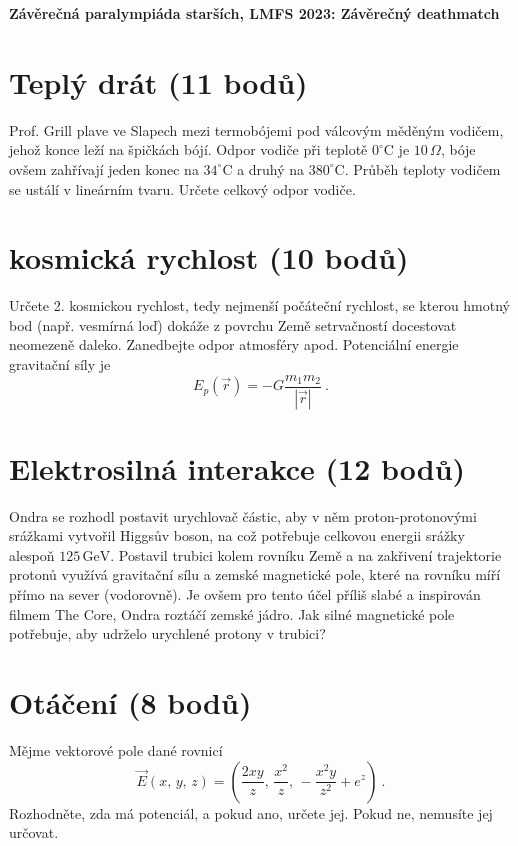 \documentclass[10pt,a4paper,landscape]{article}
\author{Ondřej Zelenka}
\begin{document}
\pagestyle{empty}
\textbf{\center\LARGE Závěrečná paralympiáda starších, LMFS 2023: Závěrečný deathmatch}
\vfill

\begin{multicols}{2}[]

\section{Teplý drát (11 bodů)}
Prof. Grill plave ve Slapech mezi termobójemi pod válcovým měděným vodičem, jehož konce leží na špičkách bójí. Odpor vodiče při teplotě $0^\circ\mathrm{C}$ je $10\,\Omega$, bóje ovšem zahřívají jeden konec na $34^\circ\mathrm{C}$ a druhý na $380^\circ\mathrm{C}$. Průběh teploty vodičem se ustálí v lineárním tvaru. Určete celkový odpor vodiče.

\begingroup\renewcommand{}
\section{kosmická rychlost (10 bodů)}
Určete 2. kosmickou rychlost, tedy nejmenší počáteční rychlost, se kterou hmotný bod (např. vesmírná loď) dokáže z povrchu Země setrvačností docestovat neomezeně daleko. Zanedbejte odpor atmosféry apod. Potenciální energie gravitační síly je
\begin{equation}
E_p\left(\vec{r}\right) = -G\frac{m_1m_2}{\left|\vec{r}\right|} ~.
\end{equation}
\endgroup

\section{Elektrosilná interakce (12 bodů)}
Ondra se rozhodl postavit urychlovač částic, aby v něm proton-protonovými srážkami vytvořil Higgsův boson, na což potřebuje celkovou energii srážky alespoň $125\,\mathrm{GeV}$. Postavil trubici kolem rovníku Země a na zakřivení trajektorie protonů využívá gravitační sílu a zemské magnetické pole, které na rovníku míří přímo na sever (vodorovně). Je ovšem pro tento účel příliš slabé a inspirován filmem The Core, Ondra roztáčí zemské jádro. Jak silné magnetické pole potřebuje, aby udrželo urychlené protony v trubici?

\section{Otáčení (8 bodů)}
Mějme vektorové pole dané rovnicí
\begin{equation}
\vec{E}\left(x,\, y,\, z\right) = \left(\frac{2xy}{z},\, \frac{x^2}{z},\, -\frac{x^2y}{z^2} + e^z\right) ~.
\end{equation}
Rozhodněte, zda má potenciál, a pokud ano, určete jej. Pokud ne, nemusíte jej určovat.


\end{multicols}
\end{document}
